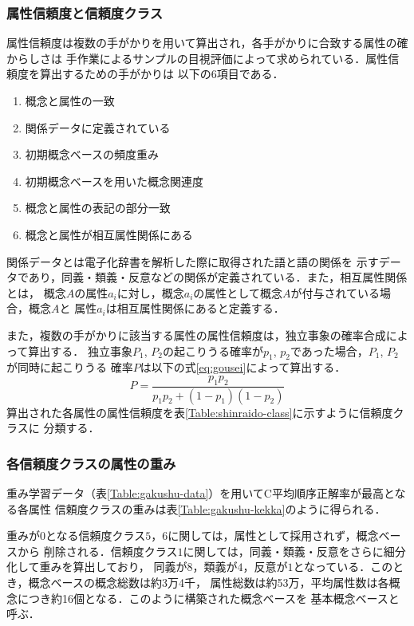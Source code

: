 \documentclass[japanese]{jnlp_1.3e}
\begin{document}
\subsubsection{属性信頼度と信頼度クラス}

属性信頼度は複数の手がかりを用いて算出され，各手がかりに合致する属性の確からしさは
手作業によるサンプルの目視評価によって求められている．属性信頼度を算出するための手がかりは
以下の6項目である．
\begin{enumerate}
\item 概念と属性の一致
\item 関係データに定義されている
\item 初期概念ベースの頻度重み
\item 初期概念ベースを用いた概念関連度
\item 概念と属性の表記の部分一致
\item 概念と属性が相互属性関係にある
\end{enumerate} 
\noindent
関係データとは電子化辞書を解析した際に取得された語と語の関係を
示すデータであり，同義・類義・反意などの関係が定義されている．また，相互属性関係とは，
概念$A$の属性$a_i$に対し，概念$a_i$の属性として概念$A$が付与されている場合，概念$A$と
属性$a_i$は相互属性関係にあると定義する．

また，複数の手がかりに該当する属性の属性信頼度は，独立事象の確率合成によって算出する．
独立事象$P_1$, $P_2$の起こりうる確率が$p_1$, $p_2$であった場合，$P_1$, $P_2$が同時に起こりうる
確率$P$は以下の式\ref{eq:gousei}によって算出する．
\begin{equation}
  P = \frac{p_1 p_2}{p_1 p_2 + (1-p_1)(1-p_2) }
  \label{eq:gousei}
\end{equation}
算出された各属性の属性信頼度を表\ref{Table:shinraido-class}に示すように信頼度クラスに
分類する．
\begin{table}[b]

\end{table}

\subsubsection{各信頼度クラスの属性の重み}

重み学習データ（表\ref{Table:gakushu-data}）を用いてC平均順序正解率が最高となる各属性
信頼度クラスの重みは表\ref{Table:gakushu-kekka}のように得られる．

\begin{table}[b]

\end{table}

重みが$0$となる信頼度クラス$5$，$6$に関しては，属性として採用されず，概念ベースから
削除される．信頼度クラス$1$に関しては，同義・類義・反意をさらに細分化して重みを算出しており，
同義が$8$，類義が$4$，反意が$1$となっている．このとき，概念ベースの概念総数は約3万4千，
属性総数は約53万，平均属性数は各概念につき約16個となる．このように構築された概念ベースを
基本概念ベースと呼ぶ．
\end{document}

